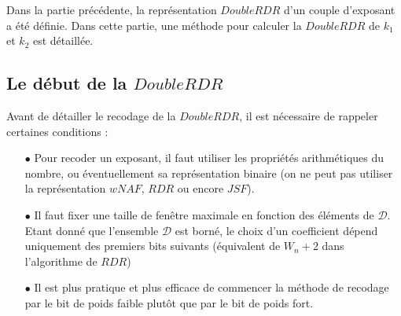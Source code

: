 \documentclass[12pt, a4paper]{memoir}
\begin{document}
Dans la partie précédente, la représentation $DoubleRDR$ d'un couple d'exposant a été définie.
Dans cette partie, une méthode pour calculer la $DoubleRDR$ de $k_1$ et $k_2$ est détaillée.

  \subsection{Le début de la $DoubleRDR$}
  
  Avant de détailler le recodage de la $DoubleRDR$, il est nécessaire de rappeler certaines conditions :
  \begin{itemize}
   \item [$\bullet$] Pour recoder un exposant, il faut utiliser les propriétés arithmétiques du nombre, ou éventuellement
   sa représentation binaire (on ne peut pas utiliser la représentation $wNAF$, $RDR$ ou encore $JSF$).
   \item [$\bullet$] Il faut fixer une taille de fenêtre maximale en fonction des éléments de $\mathcal{D}$.
   Etant donné que l'ensemble $\mathcal{D}$ est borné, le choix d'un coefficient dépend uniquement des premiers 
   bits suivants (équivalent de $W_n + 2$ dans l'algorithme de $RDR$)
   \item [$\bullet$] Il est plus pratique et plus efficace de commencer la méthode de recodage par le bit de 
   poids faible plutôt que par le bit de poids fort.
  \end{itemize}

   
   
    
\end{document}
